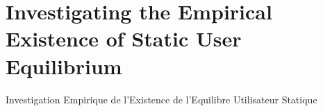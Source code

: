 


\section{Investigating the Empirical Existence of Static User Equilibrium}{Investigation Empirique de l'Existence de l'Equilibre Utilisateur Statique}


\label{ch:transportation}




